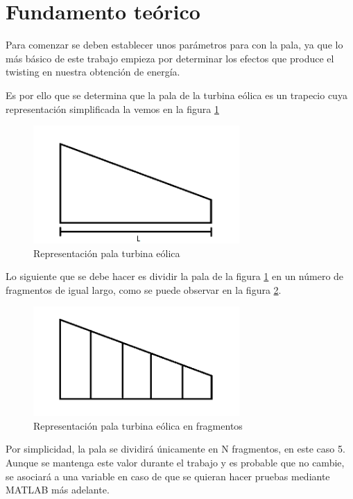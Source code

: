 \section{Fundamento teórico}

Para comenzar se deben establecer unos parámetros para con la pala, ya que lo más básico de este trabajo empieza por determinar los efectos que produce el twisting en nuestra obtención de energía.

Es por ello que se determina que la pala de la turbina eólica es un trapecio cuya representación simplificada la vemos en la figura \ref{fig:pala_simp}

\begin{figure}[H]
    \centering
    \includegraphics[width=0.7\textwidth]{images/pala turbina paint.png}
    \caption{Representación pala turbina eólica}
    \label{fig:pala_simp}
\end{figure}


Lo siguiente que se debe hacer es dividir la pala de la figura \ref{fig:pala_simp} en un número de fragmentos de igual largo, como se puede observar en la figura \ref{fig:pala_dividida}.
    
    \begin{figure}[H]
    \centering
    \includegraphics[width=0.7\textwidth]{images/pala dividida.png}
    \caption{Representación pala turbina eólica en fragmentos}
    \label{fig:pala_dividida}
\end{figure}

Por simplicidad, la pala se dividirá únicamente en N fragmentos, en este caso 5. Aunque se mantenga este valor durante el trabajo y es probable que no cambie, se asociará a una variable en caso de que se quieran hacer pruebas mediante MATLAB más adelante.
    
